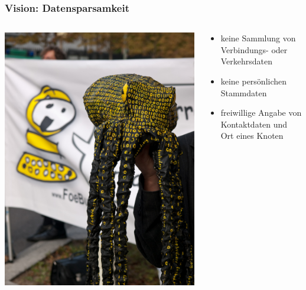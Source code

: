 \documentclass[10pt]{beamer}
\begin{document}
\begin{frame}
	\frametitle{Vision: Datensparsamkeit}
		\begin{columns}[c]
			\begin{column}{5cm}
				\includegraphics[width=\textwidth]{images/krake}
			\end{column}
			\begin{column}{7cm}
				\begin{itemize}[<+->]
					\item keine Sammlung von Verbindungs- oder Verkehrsdaten
					\item keine persönlichen Stammdaten
					\item freiwillige Angabe von Kontaktdaten und Ort eines Knoten
				\end{itemize}
			\end{column}
		\end{columns}
\end{frame}
\end{document}
